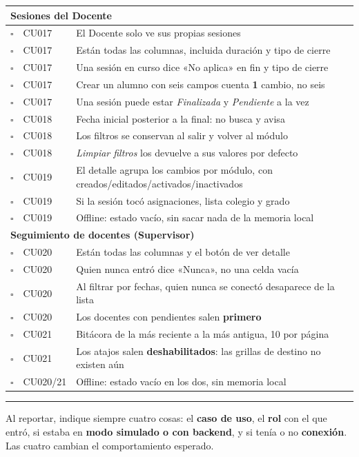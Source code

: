 \documentclass[11pt,a4paper]{article}
\newcommand{\ok}{$\square$}
\begin{document}
\begin{longtable}{|c|p{1.9cm}|p{6.1cm}|p{4.3cm}|}
\multicolumn{4}{|l|}{\cellcolor{grisclaro}\textbf{Sesiones del Docente}} \\ \hline
\ok & CU017 & El Docente solo ve sus propias sesiones & \\[0.5cm] \hline
\ok & CU017 & Están todas las columnas, incluida duración y tipo de cierre & \\[0.5cm] \hline
\ok & CU017 & Una sesión en curso dice «No aplica» en fin y tipo de cierre & \\[0.5cm] \hline
\ok & CU017 & Crear un alumno con seis campos cuenta \textbf{1} cambio, no seis & \\[0.5cm] \hline
\ok & CU017 & Una sesión puede estar \emph{Finalizada} y \emph{Pendiente} a la vez & \\[0.5cm] \hline
\ok & CU018 & Fecha inicial posterior a la final: no busca y avisa & \\[0.5cm] \hline
\ok & CU018 & Los filtros se conservan al salir y volver al módulo & \\[0.5cm] \hline
\ok & CU018 & \emph{Limpiar filtros} los devuelve a sus valores por defecto & \\[0.5cm] \hline
\ok & CU019 & El detalle agrupa los cambios por módulo, con creados/editados/activados/inactivados & \\[0.5cm] \hline
\ok & CU019 & Si la sesión tocó asignaciones, lista colegio y grado & \\[0.5cm] \hline
\ok & CU019 & Offline: estado vacío, sin sacar nada de la memoria local & \\[0.5cm] \hline

\multicolumn{4}{|l|}{\cellcolor{grisclaro}\textbf{Seguimiento de docentes (Supervisor)}} \\ \hline
\ok & CU020 & Están todas las columnas y el botón de ver detalle & \\[0.5cm] \hline
\ok & CU020 & Quien nunca entró dice «Nunca», no una celda vacía & \\[0.5cm] \hline
\ok & CU020 & Al filtrar por fechas, quien nunca se conectó desaparece de la lista & \\[0.5cm] \hline
\ok & CU020 & Los docentes con pendientes salen \textbf{primero} & \\[0.5cm] \hline
\ok & CU021 & Bitácora de la más reciente a la más antigua, 10 por página & \\[0.5cm] \hline
\ok & CU021 & Los atajos salen \textbf{deshabilitados}: las grillas de destino no existen aún & \\[0.5cm] \hline
\ok & CU020/21 & Offline: estado vacío en los dos, sin memoria local & \\[0.5cm] \hline
\end{longtable}

\vfill
\noindent\rule{\textwidth}{0.4pt}

\noindent\small Al reportar, indique siempre cuatro cosas: el \textbf{caso de
uso}, el \textbf{rol} con el que entró, si estaba en \textbf{modo simulado o con
backend}, y si tenía o no \textbf{conexión}. Las cuatro cambian el
comportamiento esperado.
\end{document}
